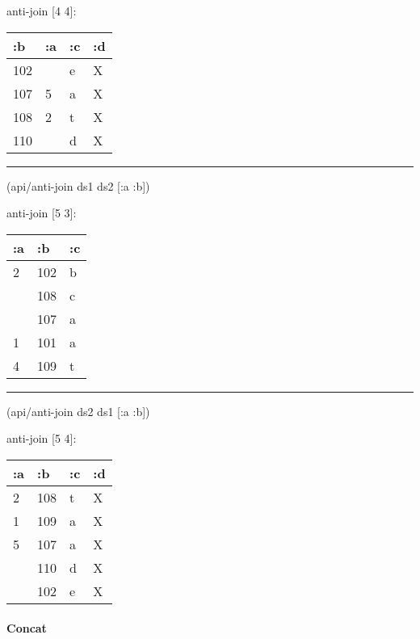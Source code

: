 \documentclass[]{article}
\newenvironment{Shaded}{\begin{snugshade}}{\end{snugshade}}
\newcommand{\AttributeTok}[1]{\textcolor[rgb]{0.77,0.63,0.00}{#1}}
\newcommand{\NormalTok}[1]{#1}
\let\oldparagraph\paragraph
\renewcommand{\paragraph}[1]{\oldparagraph{#1}\mbox{}}
\begin{document}
anti-join {[}4 4{]}:

\begin{longtable}[]{@{}llll@{}}
\toprule
:b & :a & :c & :d\tabularnewline
\midrule
\endhead
102 & & e & X\tabularnewline
107 & 5 & a & X\tabularnewline
108 & 2 & t & X\tabularnewline
110 & & d & X\tabularnewline
\bottomrule
\end{longtable}

\begin{center}\rule{0.5\linewidth}{0.5pt}\end{center}

\begin{Shaded}
\begin{Highlighting}[]
\NormalTok{(api/anti-join ds1 ds2 [}\AttributeTok{:a} \AttributeTok{:b}\NormalTok{])}
\end{Highlighting}
\end{Shaded}

anti-join {[}5 3{]}:

\begin{longtable}[]{@{}lll@{}}
\toprule
:a & :b & :c\tabularnewline
\midrule
\endhead
2 & 102 & b\tabularnewline
& 108 & c\tabularnewline
& 107 & a\tabularnewline
1 & 101 & a\tabularnewline
4 & 109 & t\tabularnewline
\bottomrule
\end{longtable}

\begin{center}\rule{0.5\linewidth}{0.5pt}\end{center}

\begin{Shaded}
\begin{Highlighting}[]
\NormalTok{(api/anti-join ds2 ds1 [}\AttributeTok{:a} \AttributeTok{:b}\NormalTok{])}
\end{Highlighting}
\end{Shaded}

anti-join {[}5 4{]}:

\begin{longtable}[]{@{}llll@{}}
\toprule
:a & :b & :c & :d\tabularnewline
\midrule
\endhead
2 & 108 & t & X\tabularnewline
1 & 109 & a & X\tabularnewline
5 & 107 & a & X\tabularnewline
& 110 & d & X\tabularnewline
& 102 & e & X\tabularnewline
\bottomrule
\end{longtable}

\paragraph{Concat}\label{concat}
\end{document}
